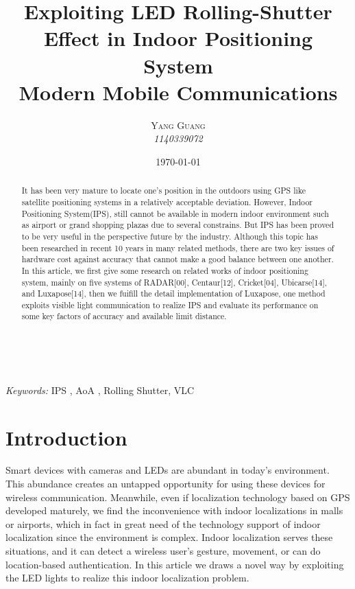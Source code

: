 \documentclass[a4paper, 11pt]{article} %
\title{\textbf{Exploiting LED Rolling-Shutter Effect in Indoor Positioning System}\\ %
Modern Mobile Communications} %
\author{\textsc{Yang Guang} %
\\{\textit{1140339072}}} %
\date{\today} %
\makeatletter
\renewcommand{\maketitle}{ %
\begin{flushright} %
{\LARGE\@title} %

\vspace{50pt} %

{\large\@author} %
\\\@date %

\vspace{40pt} %
\end{flushright}
}
\makeatother
\begin{document}
\maketitle %



\begin{abstract}
It has been very mature to locate one's position in the outdoors using GPS like satellite positioning systems in a relatively acceptable deviation. However, Indoor Positioning System(IPS), still cannot be available in modern indoor environment such as airport or grand shopping plazas due to several constrains. But IPS has been proved to be very useful in the perspective future by the industry. Although this topic has been researched in recent 10 years in many related methods, there are two key issues of hardware cost against accuracy that cannot make a good balance between one another. In this article, we first give some research on related works of indoor positioning system, mainly on five systems of RADAR[00], Centaur[12], Cricket[04], Ubicarse[14], and Luxapose[14], then we fuifill the detail implementation of Luxapose, one method exploits visible light communication to realize IPS and evaluate its performance on some key factors of accuracy and available limit distance.
\end{abstract}

\hspace*{3,6mm}\textit{Keywords:} IPS , AoA , Rolling Shutter, VLC %

\vspace{30pt} %


\section{Introduction}

 Smart devices with cameras and LEDs are abundant in today's environment. This abundance creates an untapped opportunity for using these devices for wireless communication. Meanwhile, even if localization technology based on GPS developed maturely, we find the inconvenience with indoor localizations in malls or airports, which in fact in great need of the technology support of indoor localization since the environment is complex. Indoor localization serves these situations, and it can detect a wireless user's gesture, movement, or can do location-based authentication. In this article we draws a novel way by exploiting the LED lights to realize this indoor localization problem. 
\end{document}
